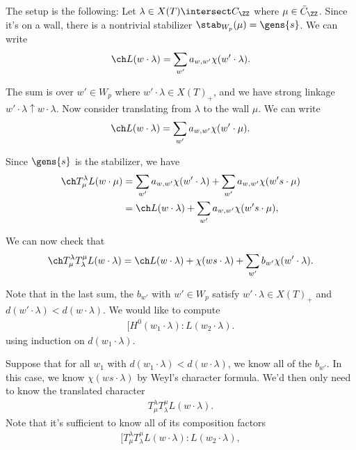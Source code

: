 The setup is the following: Let \(\lambda\in X(T) \intersect C_\ZZ\)
where \(\mu \in \bar{C}_\ZZ\). Since it's on a wall, there is a
nontrivial stabilizer \(\stab_{W_p}(\mu) = \gens{s}\). We can write
\begin{align*}  
\ch L(w\cdot \lambda) = \sum_{w'} a_{w, w'} \chi(w' \cdot \lambda)
.\end{align*}

The sum is over \(w'\in W_p\) where \(w'\cdot \lambda \in X(T)_+\), and
we have strong linkage \(w'\cdot \lambda \uparrow w\cdot \lambda\). Now
consider translating from \(\lambda\) to the wall \(\mu\). We can write
\begin{align*}  
\ch L(w\cdot \lambda) = \sum_{w'} a_{w, w'} \chi(w' \cdot \mu)
.\end{align*}

Since \(\gens{s}\) is the stabilizer, we have
\begin{align*}  
\ch T_\mu^\lambda L(w\cdot \mu)
&= \sum_{w'} a_{w, w'} \chi(w' \cdot \lambda)
+ \sum_{w'} a_{w, w'} \chi(w's \cdot \mu) \\
&= \ch L(w\cdot \lambda)
+ \sum_{w'} a_{w, w'} \chi(w's \cdot \mu)
,\end{align*}

We can now check that
\begin{align*}  
\ch T_\mu^\lambda T_\lambda^\mu L(w\cdot \lambda) = 
\ch L(w\cdot \lambda) + \chi(ws\cdot \lambda ) + \sum_{w'} b_{w'} \chi(w'\cdot\lambda)
.\end{align*}

Note that in the last sum, the \(b_{w'}\) with \(w'\in W_p\) satisfy
\(w'\cdot \lambda \in X(T)_+\) and
\(d(w'\cdot\lambda) < d(w\cdot \lambda)\). We would like to compute
\begin{align*}  
[H^0(w_1\cdot \lambda) : L(w_2\cdot \lambda)
.\end{align*} using induction on \(d(w_1\cdot \lambda)\).

Suppose that for all \(w_1\) with
\(d(w_1\cdot\lambda) < d(w\cdot \lambda)\), we know all of the
\(b_{w'}\). In this case, we know \(\chi(ws\cdot \lambda)\) by Weyl's
character formula. We'd then only need to know the translated character
\begin{align*}  
T_\mu^\lambda T_\lambda^\mu L(w\cdot \lambda)
.\end{align*} Note that it's sufficient to know all of its composition
factors
\begin{align*}  
[T_\mu^\lambda T_\lambda^\mu L(w\cdot \lambda): L(w_2\cdot \lambda)
,\end{align*}

